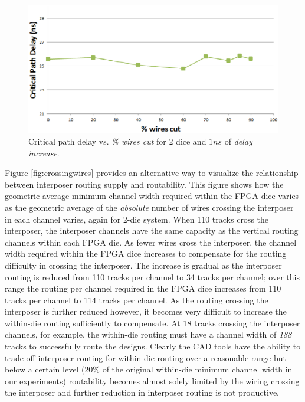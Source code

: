 \documentclass[journal]{IEEEtran}
\begin{document}
\begin{figure}[!htbp]
\centering
\includegraphics[width=\linewidth]{standard_crit_path_new.eps}
\caption{Critical path delay vs. \textit{\% wires cut} for 2 dice and $1ns$ of \textit{delay increase}.}
\label{fig:standard_crit}
\end{figure}

Figure \ref{fig:crossingwires} provides an alternative way to visualize the relationship between interposer routing supply and routability. This figure shows how the geometric average minimum channel width required within the FPGA dice varies as the geometric average of the \emph{absolute} number of wires crossing the interposer in each channel varies, again for 2-die system. When 110 tracks cross the interposer, the interposer channels have the same capacity as the vertical routing channels within each FPGA die. As fewer wires cross the interposer, the channel width required within the FPGA dice increases to compensate for the routing difficulty in crossing the interposer. The increase is gradual as the interposer routing is reduced from 110 tracks per channel to 34 tracks per channel; over this range the routing per channel required in the FPGA dice increases from 110 tracks per channel to 114 tracks per channel. As the routing crossing the interposer is further reduced however, it becomes very difficult to increase the within-die routing sufficiently to compensate. At 18 tracks crossing the interposer channels, for example, the within-die routing must have a channel width of \emph{188} tracks to successfully route the designs. Clearly the CAD tools have the ability to trade-off interposer routing for within-die routing over a reasonable range but below a certain level (20\% of the original within-die minimum channel width in our experiments) routability becomes almost solely limited by the wiring crossing the interposer and further reduction in interposer routing is not productive.
\end{document}
